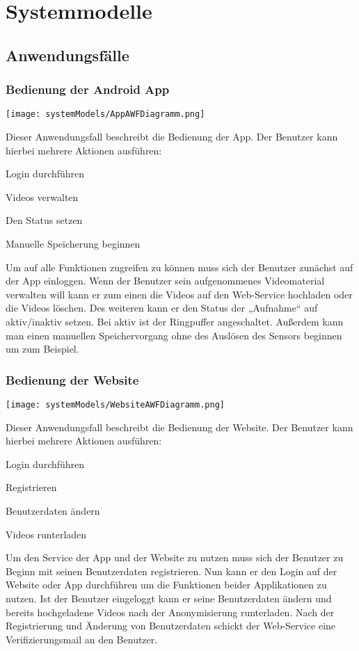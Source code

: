 \chapter{Systemmodelle}
\section{Anwendungsfälle}
\subsection{Bedienung der Android App}
\begin{center}
\texttt{[image: systemModels/AppAWFDiagramm.png]}
\end{center}
Dieser Anwendungsfall beschreibt die Bedienung der App. 
Der Benutzer kann hierbei mehrere Aktionen ausführen:
\begin{description}
\item Login durchführen
\item Videos verwalten
\item Den Status setzen
\item Manuelle Speicherung beginnen
\end{description}
Um auf alle Funktionen zugreifen zu können muss sich der Benutzer zunächst auf der App einloggen. 
Wenn der Benutzer sein aufgenommenes Videomaterial verwalten will kann er zum einen die Videos auf den Web-Service hochladen oder die Videos löschen.
Des weiteren kann er den Status der „Aufnahme“ auf aktiv/inaktiv setzen. Bei aktiv ist der Ringpuffer angeschaltet. 
Außerdem kann man einen manuellen Speichervorgang ohne des Auslösen des Sensors beginnen um zum Beispiel.

\subsection{Bedienung der Website}
\begin{center}
\texttt{[image: systemModels/WebsiteAWFDiagramm.png]}
\end{center}
Dieser Anwendungsfall beschreibt die Bedienung der Website.
Der Benutzer kann hierbei mehrere Aktionen ausführen:
\begin{description}
\item Login durchführen
\item Registrieren
\item Benutzerdaten ändern
\item Videos runterladen
\end{description}
Um den Service der App und der Website zu nutzen muss sich der Benutzer zu Beginn mit seinen Benutzerdaten registrieren. 
Nun kann er den Login auf der Website oder App durchführen um die Funktionen beider Applikationen zu nutzen. 
Ist der Benutzer eingeloggt kann er seine Benutzerdaten ändern und bereits hochgeladene Videos nach der Anonymisierung runterladen.
Nach der Registrierung und Änderung von Benutzerdaten schickt der Web-Service eine Verifizierungsmail an den Benutzer.